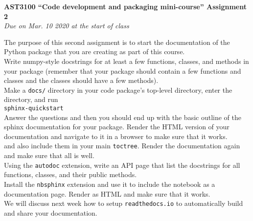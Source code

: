 \documentclass[12pt]{article}
\begin{document}
\begin{center}
{\bf \LARGE AST3100 ``Code development and packaging mini-course'' Assignment 2}\\[7pt]
\emph{Due on Mar. 10 2020  at the start of class}\\[7pt]
\end{center}

The purpose of this second assignment is to start the documentation of
 the Python package that you are creating as part of this course.\\

 Write
numpy-style docstrings for at least a few functions, classes, and
methods in your package (remember that your package should contain a
few functions and classes and the classes should have a few methods).\\

 Make a \texttt{docs/} directory in your code package's top-level directory, enter the directory, and run\\

\texttt{sphinx-quickstart}\\

Answer the questions and then you should end up with the basic outline
of the sphinx documentation for your package. Render the HTML version
of your documentation and navigate to it in a browser to make sure
that it works.\\

 and also include them in your main
\texttt{toctree}. Render the documentation again and make sure that
all is well.\\

 Using the
\texttt{autodoc} extension, write an API page that list the docstrings
for all functions, classes, and their public methods.\\

Install the \texttt{nbsphinx} extension and use it to include the
notebook as a documentation page. Render as HTML and make sure that it
works.\\

We will discuss next week how to setup \texttt{readthedocs.io} to
automatically build and share your documentation.
\end{document}
